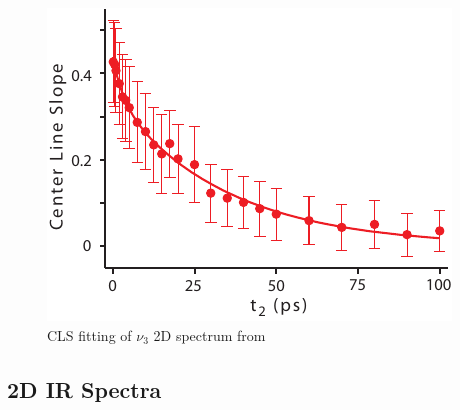 \documentclass[%
  class = book,%
  crop = false,%
  float = true,%
  multi = true,%
  preview = false,%
]{standalone}
\begin{document}
{\begin{figure}[h]
  \centering
  \includegraphics[scale=1]{CLS_fit_BMIMTFA.pdf}
  \caption[CLS fitting of 2D-IR spectrum]{CLS fitting of  \(\nu_3\) 2D spectrum from \ce{[Im_{4,1}][TFA]}}
\end{figure}

\subsection{2D IR Spectra}
\label{anionSI_2D}

}
\end{document}
